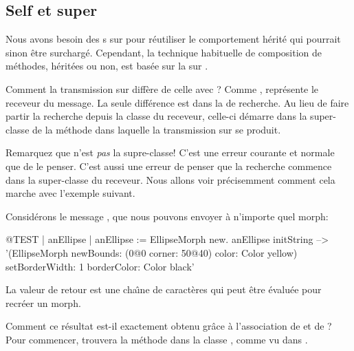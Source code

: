 \documentclass[a4paper,10pt,twoside]{book}
\begin{document}

\subsection{Self et super}

Nous avons besoin des s sur \super pour 
r\'eutiliser le comportement h\'erit\'e qui pourrait sinon \^etre
surcharg\'e.
Cependant, la technique habituelle de composition de m\'ethodes,
h\'erit\'ees ou non, est bas\'ee sur la  sur
\self.

Comment la transmission sur \self diff\`ere de celle avec \super?
Comme \self, \super repr\'esente le receveur du message.
La seule diff\'erence est dans la  de recherche.
Au lieu de faire partir la recherche depuis la classe du receveur,
celle-ci d\'emarre dans la super-classe de la m\'ethode dans laquelle la
transmission sur \super se produit. 

Remarquez que \super n'est \emph{pas} la supre-classe!
C'est une erreur courante et normale que de le penser.
C'est aussi une erreur de penser que la recherche commence dans la super-classe du receveur.
Nous allons voir pr\'ecisemment comment cela marche avec l'exemple suivant.

Consid\'erons le message , que nous pouvons envoyer \`a 
n'importe quel morph:
\begin{code}{@TEST | anEllipse | anEllipse := EllipseMorph new.}
anEllipse initString --> '(EllipseMorph newBounds: (0@0 corner: 50@40) color: Color yellow) setBorderWidth: 1 borderColor: Color black'
\end{code}
La valeur de retour est une cha\^{\i}ne de caract\`eres qui peut \^etre
\'evalu\'ee pour recr\'eer un morph.

Comment ce r\'esultat est-il exactement obtenu gr\^ace \`a l'association
de \self et de \super?
Pour commencer, 
 trouvera la m\'ethode  dans la 
classe ,
comme vu dans .
\end{document}
